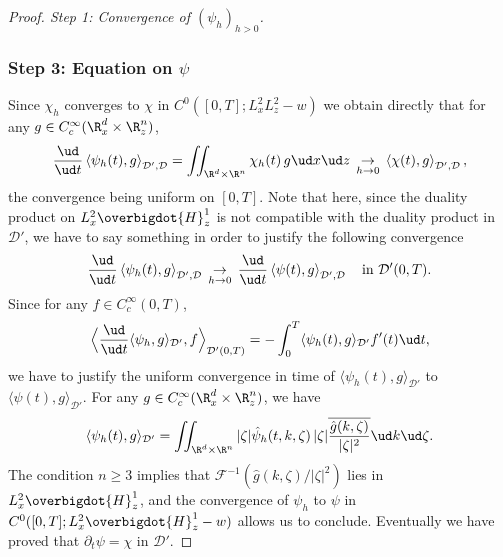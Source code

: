 \begin{proof}[Proof. Step 1: Convergence of $(\psi_{h})_{h>0}$]
\subsubsection*{Step 3: Equation on $\psi$} Since $\chi_{h}$ converges to $\chi$ in $C^{0}([0,T];L_{x}^{2}L_{z}^{2}-w)$ we obtain directly that for any $g\in C_{c}^{\infty}(\R_{x}^{d}\times\R_{z}^{n})$,
\[
\frac{\ud}{\ud t}\left\langle\psi_{h}(t),g\right\rangle_{\mathcal{D}',\mathcal{D}}=\iint_{\R^{d}\times\R^{n}}\chi_{h}(t)\,g\ud x\ud z\,\underset{h\to 0}{\to}\,\left\langle\chi(t),g\right\rangle_{\mathcal{D}',\mathcal{D}},
\]
the convergence being uniform on $[0,T]$. Note that here, since the duality product on $L_{x}^{2}\overbigdot{H}_{z}^{1}$ is not compatible with the duality product in $\mathcal{D}'$, we have to say something in order to justify the following convergence
\[
\frac{\ud}{\ud t}\left\langle\psi_{h}(t),g\right\rangle_{\mathcal{D}',\mathcal{D}}\,\underset{h\to 0}{\to}\,\frac{\ud}{\ud t}\left\langle\psi(t),g\right\rangle_{\mathcal{D}',\mathcal{D}}\quad\text{in }\mathcal{D}'(0,T).
\]
Since for any $f\in C_{c}^{\infty}(0,T)$,\vspace*{-3pt}
\[
\Bigl\langle\frac{\ud}{\ud t}\langle\psi_{h},g\rangle_{\mathcal{D}'},f\Bigr\rangle_{\mathcal{D'}(0,T)}=-\int_{0}^{T}\langle\psi_{h}(t),g\rangle_{\mathcal{D}'}f'(t)\ud t,
\]
we have to justify the uniform convergence in time of $\langle\psi_{h}(t),g\rangle_{\mathcal{D}'}$ to $\langle\psi(t),g\rangle_{\mathcal{D}'}$. For any $g\in C_{c}^{\infty}(\R_{x}^{d}\times\R_{z}^{n})$, we have
\[
\langle\psi_{h}(t),g\rangle_{\mathcal{D}'}=\iint_{\R^{d}\times\R^{n}}|\zeta|\hat{\psi}_{h}(t,k,\zeta)\,|\zeta|\overline{\frac{\hat{g}(k,\zeta)}{|\zeta|^{2}}}\ud k\ud\zeta.
\]
The condition $n\geq 3$ implies that $\mathcal{F}^{-1}(\hat{g}(k,\zeta)/|\zeta|^{2})$ lies in $L_{x}^{2}\overbigdot{H}_{z}^{1}$, and the convergence of $\psi_{h}$ to $\psi$ in $C^{0}([0,T];L_{x}^{2}\overbigdot{H}_{z}^{1}-w)$ allows us to conclude. Eventually we have proved that $\partial_{t}\psi=\chi$ in $\mathcal{D}'$.


\end{proof}

